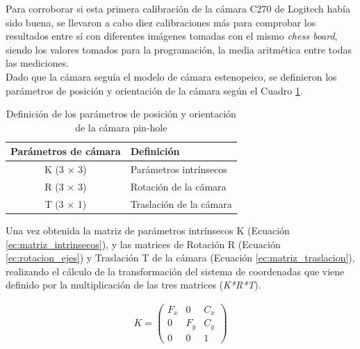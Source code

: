 Para corroborar si esta primera calibración de la cámara C270 de Logitech había sido buena, se llevaron a cabo diez calibraciones más para comprobar los resultados entre sí con diferentes imágenes tomadas con el mismo \textit{chess board}, siendo los valores tomados para la programación, la media aritmética entre todas las mediciones.\\

Dado que la cámara seguía el modelo de cámara estenopeico, se definieron los parámetros de posición y orientación de la cámara según el Cuadro \ref{tab:parametros_camara}.

  \begin{table}[H]
    \centering
    \begin{tabular}{cl}
      \toprule
      \textbf{Parámetros de cámara} & \textbf{Definición} \\
      \midrule
       K (3 × 3)   & Parámetros intrínsecos \\
       R (3 × 3)   & Rotación de la cámara \\
       T (3 × 1)   & Traslación de la cámara \\
      \bottomrule
    \end{tabular}
    \caption{Definición de los parámetros de posición y orientación de la cámara pin-hole}
    \label{tab:parametros_camara}
  \end{table}

Una vez obtenida la matriz de parámetros intrínsecos K (Ecuación \ref{ec:matriz_intrinsecos}), y las matrices de Rotación R (Ecuación \ref{ec:rotacion_ejes}) y Traslación T de la cámara (Ecuación \ref{ec:matriz_traslacion}), realizando el cálculo de la transformación del sistema de coordenadas que viene definido por la multiplicación de las tres matrices (\textit{K*R*T}). 
 
  \begin{myequation}[H]
    \begin{align}
      K = 
      \begin{pmatrix}
        F_x & 0   & C_x \\
        0   & F_y & C_y \\
        0   & 0   & 1
      \end{pmatrix}
      \nonumber
    \end{align}
    \caption{Matriz de parámetros intrínsecos de la cámara}
    \label{ec:matriz_intrinsecos}
  \end{myequation}


